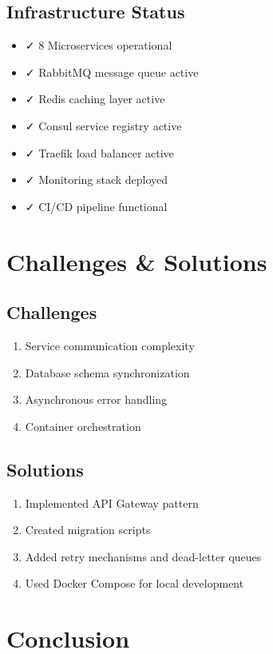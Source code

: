 \documentclass[12pt,a4paper]{article}
\begin{document}
\subsection{Infrastructure Status}
\begin{itemize}
    \item ✓ 8 Microservices operational
    \item ✓ RabbitMQ message queue active
    \item ✓ Redis caching layer active
    \item ✓ Consul service registry active
    \item ✓ Traefik load balancer active
    \item ✓ Monitoring stack deployed
    \item ✓ CI/CD pipeline functional
\end{itemize}

\section{Challenges \& Solutions}

\subsection{Challenges}
\begin{enumerate}
    \item Service communication complexity
    \item Database schema synchronization
    \item Asynchronous error handling
    \item Container orchestration
\end{enumerate}

\subsection{Solutions}
\begin{enumerate}
    \item Implemented API Gateway pattern
    \item Created migration scripts
    \item Added retry mechanisms and dead-letter queues
    \item Used Docker Compose for local development
\end{enumerate}

\section{Conclusion}
\end{document}
